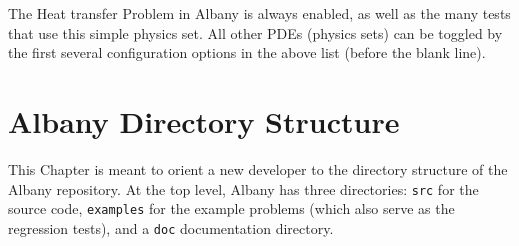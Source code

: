 \documentclass[pdf,12pt,report,strict]{SANDreport}
\theoremstyle{remark}
\begin{document}
The Heat transfer Problem in Albany is always enabled, as well as the many tests
that use this simple physics set. All other PDEs (physics sets) can be toggled
by the first several configuration options in the above list (before the blank line).

\chapter{Albany Directory Structure}
\label{directories}

This Chapter is meant to orient a new developer to the directory structure of
the Albany repository.
At the top level, Albany has three directories: \texttt{src} for the source code,
\texttt{examples} for the example problems (which also serve as the regression tests),
and a \texttt{doc} documentation directory.
\end{document}
